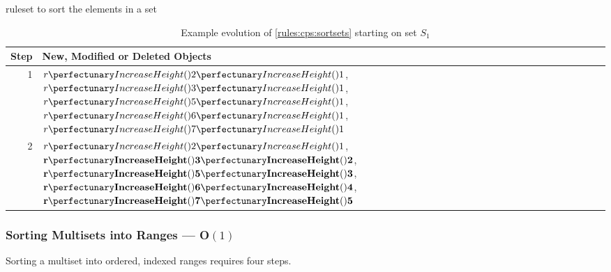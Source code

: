 \begin{cprulesetfloat} \begin{cpruleset}

\end{cpruleset}
\caption{\label{rules:cps:sortsets}\Gls{ruleset} to sort the elements in a set}
\end{cprulesetfloat}

\begin{table} \centering
   \begin{tabular}{|r|l|}
    \hline
    \textbf{Step} & \textbf{New, Modified or Deleted Objects} \\ \hline
    1 & \(\cpfuncn{r}{2}{1}\), \(\cpfuncn{r}{3}{1}\), \(\cpfuncn{r}{5}{1}\), \(\cpfuncn{r}{6}{1}\), \(\cpfuncn{r}{7}{1}\)\\ \hline
    2 & \(\cpfuncn{r}{2}{1}\), \(\mathbf{\cpfuncn{r}{3}{2}}\), \(\mathbf{\cpfuncn{r}{5}{3}}\), \(\mathbf{\cpfuncn{r}{6}{4}}\), \(\mathbf{\cpfuncn{r}{7}{5}}\)\\ \hline

\end{tabular}
\caption[Example evolution of \cref{rules:cps:sortsets}]{\label{tab:cps:sortsets}Example evolution of \cref{rules:cps:sortsets} starting on set \(S_1\)}
\end{table}

\subsubsection{Sorting Multisets into Ranges --- O\((1)\)}\label{sec:cps:sortmultisetrange}

\begin{proposition}\label{prop:cps:sortmultisetrange}
Sorting a multiset into ordered, indexed ranges requires four steps.
\end{proposition}

